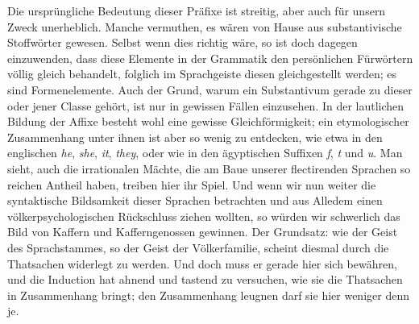 \noindent
Die ursprüngliche Bedeutung dieser Präfixe ist streitig, aber auch für unsern Zweck unerheblich. Manche vermuthen, es wären von Hause aus substantivische Stoffwörter gewesen. Selbst wenn dies richtig wäre, so ist doch dagegen einzuwenden, dass diese Elemente in der Grammatik den persönlichen Fürwörtern völlig gleich behandelt, folglich im Sprachgeiste diesen gleichgestellt werden; es sind  Formenelemente. Auch der Grund, warum ein Substantivum gerade zu dieser oder jener Classe gehört, ist nur in gewissen Fällen einzusehen. In der lautlichen Bildung der Affixe besteht wohl eine gewisse Gleichförmigkeit; ein etymologischer Zusammenhang unter ihnen ist aber so wenig zu entdecken, wie etwa in den englischen \textit{he}, \textit{she}, \textit{it}, \textit{they}, oder wie in den ägyptischen Suffixen \textit{f}, \textit{t} und \textit{u}. Man sieht, auch die irrationalen Mächte, die am Baue unserer flectirenden Sprachen so reichen Antheil haben, treiben hier ihr Spiel.  Und wenn wir nun weiter die syntaktische Bildsamkeit dieser Sprachen betrachten und aus Alledem einen völkerpsychologischen Rückschluss ziehen wollten, so würden wir \label{sp.422} schwerlich das Bild von Kaffern und Kafferngenossen gewinnen. Der Grundsatz: wie der Geist des Sprachstammes, so der Geist der Völkerfamilie, scheint diesmal durch die Thatsachen widerlegt zu werden. Und doch muss er gerade hier sich bewähren, und die Induction hat ahnend und tastend zu versuchen, wie sie die Thatsachen in Zusammenhang bringt; den Zusammenhang leugnen darf sie hier weniger denn je.

